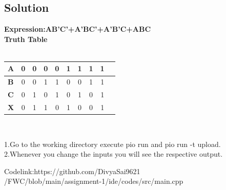 \documentclass[10pt]{report}
\begin{document}
\begin{multicols}{2}
\section{Solution} 
\centering
\textbf{Expression:AB'C'+A'BC'+A'B'C+ABC}\\
\textbf{Truth Table}\\
\
\\\begin{tabular}{|l|c|c|c|c|c|c|c|c|c|}
\hline
\textbf{A} & 0 & 0 & 0 & 0 & 1 & 1 & 1 & 1\\
\hline
\textbf{B} & 0 & 0 & 1 & 1 & 0 & 0 & 1 & 1\\
\hline
\textbf{C} & 0 & 1 & 0 & 1 & 0 & 1 & 0 & 1\\
\hline
\textbf{X} & 0 & 1 & 1 & 0 & 1 & 0 & 0 & 1\\
\hline
\end{tabular}\\
\vspace{1cm}
\raggedright 1.Go to the working directory execute pio run and pio run -t upload.\\
2.Whenever you change the inputs you will see the respective output. \\
\vspace{1cm}
\raggedright Codelink:https://github.com/DivyaSai9621\\/FWC/blob/main/assignment-1/ide/codes/src/main.cpp

\end{multicols}
\end{document}
